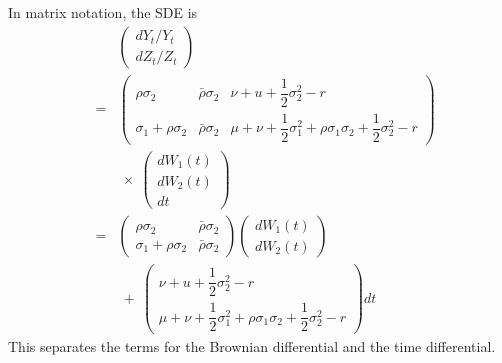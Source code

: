 \documentclass[uplatex,a4j,12pt,dvipdfmx]{jsarticle}
\begin{document}
In matrix notation, the SDE is
%
%
\begin{eqnarray*}
	&&
	\left(
	\begin{array}{c}
		d Y_{t} / Y_{t}
		\\[2mm]
		d Z_{t} / Z_{t}
	\end{array}
	\right)
	\\ &=&
	\left(
	\begin{array}{ccc}
		\rho \sigma_{2}              & \bar{\rho} \sigma_{2} & \nu + u + \dfrac{1}{2} \sigma_{2}^{2} - r
		\\
		\sigma_{1} + \rho \sigma_{2} & \bar{\rho} \sigma_{2} & \mu + \nu + \dfrac{1}{2} \sigma_{1}^{2} + \rho \sigma_{1} \sigma_{2} + \dfrac{1}{2} \sigma_{2}^{2} - r
	\end{array}
	\right)
	\\ && \ \times \
	\left(
	\begin{array}{c}
		dW_{1}(t)
		\\
		dW_{2}(t)
		\\
		dt
	\end{array}
	\right)
	\\ &=&
	\left(
	\begin{array}{cc}
		\rho \sigma_{2}              & \bar{\rho} \sigma_{2}
		\\
		\sigma_{1} + \rho \sigma_{2} & \bar{\rho} \sigma_{2}
	\end{array}
	\right)
	\left(
	\begin{array}{c}
		dW_{1}(t)
		\\
		dW_{2}(t)
	\end{array}
	\right)
	\\ && \ + \
	\left(
	\begin{array}{c}
		\nu + u + \dfrac{1}{2} \sigma_{2}^{2} - r
		\\
		\mu + \nu + \dfrac{1}{2} \sigma_{1}^{2} + \rho \sigma_{1} \sigma_{2} + \dfrac{1}{2} \sigma_{2}^{2} - r
	\end{array}
	\right)
	dt
\end{eqnarray*}
%
%
This separates the terms for the Brownian differential and the time differential.
\end{document}
